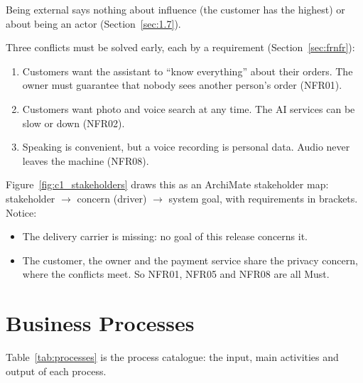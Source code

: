 Being external says nothing about influence (the customer has the highest) or about being an actor
(Section~\ref{sec:1.7}).

Three conflicts must be solved early, each by a requirement (Section~\ref{sec:frnfr}):
\begin{enumerate}
\item Customers want the assistant to ``know everything'' about their orders. The owner must guarantee that nobody
      sees another person's order (NFR01).
\item Customers want photo and voice search at any time. The AI services can be slow or down (NFR02).
\item Speaking is convenient, but a voice recording is personal data. Audio never leaves the machine (NFR08).
\end{enumerate}

Figure~\ref{fig:c1_stakeholders} draws this as an ArchiMate stakeholder map: stakeholder $\rightarrow$ concern
(driver) $\rightarrow$ system goal, with requirements in brackets. Notice:
\begin{itemize}
\item The delivery carrier is missing: no goal of this release concerns it.
\item The customer, the owner and the payment service share the privacy concern, where the conflicts meet. So
      NFR01, NFR05 and NFR08 are all Must.
\end{itemize}


\section{Business Processes}\label{sec:1.4}

Table~\ref{tab:processes} is the process catalogue: the input, main activities and output of each process.

